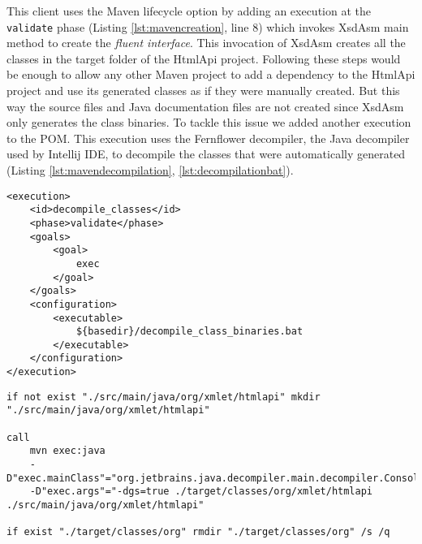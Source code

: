 \noindent
This client uses the Maven lifecycle option by adding an execution at the \texttt{validate} phase (Listing \ref{lst:mavencreation}, line 8) which invokes XsdAsm main method to create the \textit{fluent interface}. This invocation of XsdAsm creates all the classes in the target folder of the HtmlApi project. Following these steps would be enough to allow any other Maven project to add a dependency to the HtmlApi project and use its generated classes as if they were manually created. But this way the source files and Java documentation files are not created since XsdAsm only generates the class binaries. To tackle this issue we added another execution to the \ac{POM}. This execution uses the Fernflower\cite{fernflower} decompiler, the Java decompiler used by Intellij\cite{intellij} \ac{IDE}, to decompile the classes that were automatically generated (Listing \ref{lst:mavendecompilation}, \ref{lst:decompilationbat}). 

\bigskip


\begin{minipage}{\linewidth}
\begin{lstlisting}[caption={Maven - Decompiling Classes using a Plugin},label={lst:mavendecompilation}]
<execution>
    <id>decompile_classes</id>
    <phase>validate</phase>
    <goals>
        <goal>
            exec
        </goal>
    </goals>
    <configuration>
        <executable>
            ${basedir}/decompile_class_binaries.bat
        </executable>
    </configuration>
</execution>
\end{lstlisting}
\end{minipage}


\begin{minipage}{\linewidth}
\begin{lstlisting}[caption={Maven - The Code to Decompile the Generated Classes (decompile\_class\_binaries.bat)},label={lst:decompilationbat}]
if not exist "./src/main/java/org/xmlet/htmlapi" mkdir "./src/main/java/org/xmlet/htmlapi"

call 
    mvn exec:java 
    -D"exec.mainClass"="org.jetbrains.java.decompiler.main.decompiler.ConsoleDecompiler" 
    -D"exec.args"="-dgs=true ./target/classes/org/xmlet/htmlapi ./src/main/java/org/xmlet/htmlapi"

if exist "./target/classes/org" rmdir "./target/classes/org" /s /q
\end{lstlisting}
\end{minipage}

